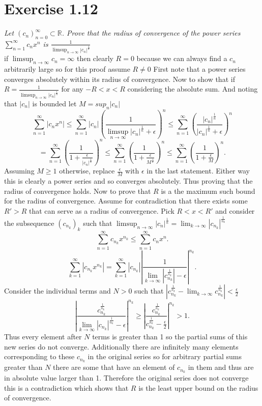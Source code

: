 \documentclass{amsart}
\begin{document}
        \section{Exercise 1.12}
        \emph{
            Let $(c_n)_{n=0}^{\infty} \subset \mathbb{R}$. Prove that the radius of convergence of the power series 
            $\sum_{n=1}^{\infty}c_nx^{n}$ is $\frac{1}{\limsup_{n\to \infty}|c_n|^{\frac{1}{n}}}$
        }\\
        if $\limsup_{n\to \infty}c_n = \infty$ then clearly $R = 0$ because we can always find a $c_n$ arbitrarily large so for this proof assume $R \ne 0$
        First note that a power series converges absolutely within its radius of convergence.
        Now to show that if $R = \frac{1}{\limsup_{n\to \infty}|c_n|^{\frac{1}{n}}}$  for any $-R < x < R$ considering
        the absolute sum. And noting that $|c_n|$ is bounded let $M = sup_{n}|c_n|$
         \[
        \sum_{n=1}^{\infty}|c_nx^{n}| \le \sum_{n=1}^{\infty}|c_n|(\frac{1}{\limsup_{n\to \infty}|c_n|^{\frac{1}{n}} + \epsilon})^{n} \le \sum_{n=1}^{\infty}(\frac{|c_n|^{\frac{1}{n}}}{|c_n|^{\frac{1}{n}}+\epsilon})^{n} 
        \] 
        \[
        = \sum_{n=1}^{\infty}(\frac{1}{1+\frac{\epsilon}{|c_n|^{\frac{1}{n}}}})^{n} \le \sum_{n=1}^{\infty}(\frac{1}{1+\frac{\epsilon}{M^{\frac{1}{n}}}})^{n} \le \sum_{n=1}^{\infty}(\frac{1}{1+\frac{\epsilon}{M}})^{n}
        .\] 
        Assuming $M \ge 1$ otherwise, replace  $\frac{\epsilon}{M}$ with $\epsilon$ in the last statement.
        Either way this is clearly a power series and so converges absolutely. Thus proving that the radius of convergence holds.
        Now to prove that $R$ is a the maximum such bound for the radius of convergence.
        Assume for contradiction that there exists some $R' > R$ that can serve as a radius of convergence.
        Pick $R < x < R' $ and consider the subsequence  $(c_{n_k})_k$ such that $\limsup_{n\to \infty}|c_n|^{\frac{1}{n}} = \lim_{k\to \infty}|c_{n_k}|^{\frac{1}{n_k}}$
        \[
            \sum_{n=1}^{\infty}c_{n_k}x^{n_k} \le \sum_{n=1}^{\infty}c_nx^{n}
        .\] 
        \[
            \sum_{k=1}^{\infty}|c_{n_k}x^{n_k}| = \sum_{k=1}^{\infty}|c_{n_k}||\frac{1}{\lim_{k\to \infty}|c_{n_k}^{\frac{1}{n_k}}|-\epsilon}|^{n_k}
        .\] 
        Consider the individual terms and $N > 0$ such that $|c_{n_k}^{\frac{1}{n_k}} - \lim_{k\to \infty}c_{n_k}^{\frac{1}{n_k}}| < \frac{\epsilon}{2}$
         \[
             |\frac{c_{n_k}^{\frac{1}{n_k}}}{\lim_{k\to \infty}|c_{n_k}|^{\frac{1}{n_k}}-\epsilon}|^{n_k} \ge |\frac{c_{n_k}^{\frac{1}{n_k}}}{c_{n_k}^{\frac{1}{n_k}}-\frac{\epsilon}{2}}|^{n_k} > 1
         .\] 
         Thus every element after $N$ terms is greater than 1 so the partial sums of this new series do not converge.
         Additionally there are infinitely many elements corresponding to these $c_{n_k}$ in the original series
         so for arbitrary partial sums greater than $N$ there are some that have an element of  $c_{n_k}$ in them and thus are in absolute value
         larger than 1. Therefore the original series does not converge this is a contradiction which shows that $R$ is the least upper bound on the radius of convergence. 
\end{document}
